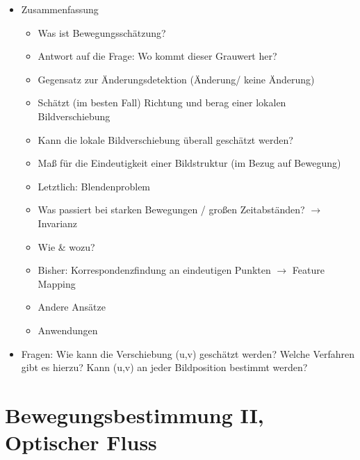 \documentclass{report}
\begin{document}
\begin{itemize}
		\item Zusammenfassung
		\begin{itemize}
			\item Was ist Bewegungsschätzung?
			\item Antwort auf die Frage: Wo kommt dieser Grauwert her?
			\item Gegensatz zur Änderungsdetektion (Änderung/ keine Änderung)
			\item Schätzt (im besten Fall) Richtung und berag einer lokalen Bildverschiebung\newline
			
			\item Kann die lokale Bildverschiebung überall geschätzt werden?
			\item Maß für die Eindeutigkeit einer Bildstruktur (im Bezug auf Bewegung)
			\item Letztlich: Blendenproblem
			\item Was passiert bei starken Bewegungen / großen Zeitabständen? $\rightarrow$ Invarianz\newline
			
			\item Wie \& wozu?
			\item Bisher: Korrespondenzfindung an eindeutigen Punkten $\rightarrow$ Feature Mapping
			\item Andere Ansätze
			\item Anwendungen
		\end{itemize}
		
		\item Fragen:
		\newline Wie kann die Verschiebung (u,v) geschätzt werden?
		\newline Welche Verfahren gibt es hierzu?
		\newline Kann (u,v) an jeder Bildposition bestimmt werden?
	\end{itemize}
	\newpage
	

	\section{Bewegungsbestimmung II, Optischer Fluss}
	
\end{document}
